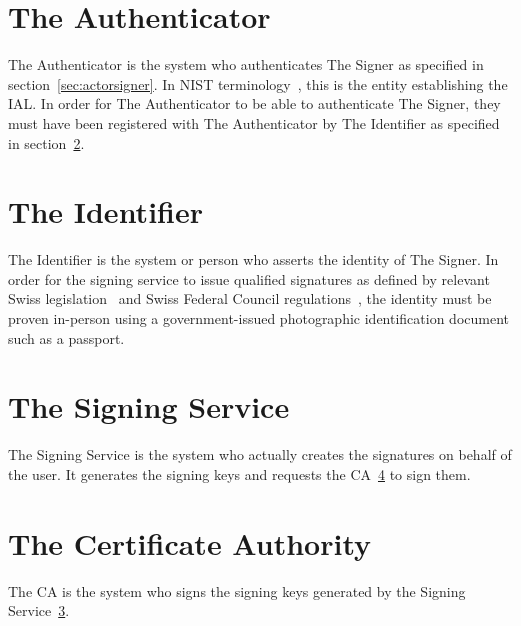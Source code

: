 \section{The Authenticator}
\label{sec:actorauthenticator}
The Authenticator is the system who authenticates The Signer as specified in section~\ref{sec:actorsigner}.
In \gls{NIST} terminology~\cite{nistdigitalidentityguidelines}, this is the entity establishing the \gls{IAL}.
In order for The Authenticator to be able to authenticate The Signer,
they must have been registered with The Authenticator by The Identifier as specified in section~\ref{sec:authoridentifier}.

\section{The Identifier}
\label{sec:authoridentifier}
The Identifier is the system or person who asserts the identity of The Signer.
In order for the signing service to issue qualified signatures as defined by relevant Swiss legislation~\cite{zertes} and Swiss Federal Council regulations~\cite{vzertes},
the identity must be proven in-person using a government-issued photographic identification document such as a passport.

\section{The Signing Service}
\label{sec:signingservice}
The Signing Service is the system who actually creates the signatures on behalf of the user.
It generates the signing keys and requests the \gls{CA}~\ref{sec:ca} to sign them.

\section{The Certificate Authority}
\label{sec:ca}
The \gls{CA} is the system who signs the signing keys generated by the Signing Service~\ref{sec:signingservice}.
